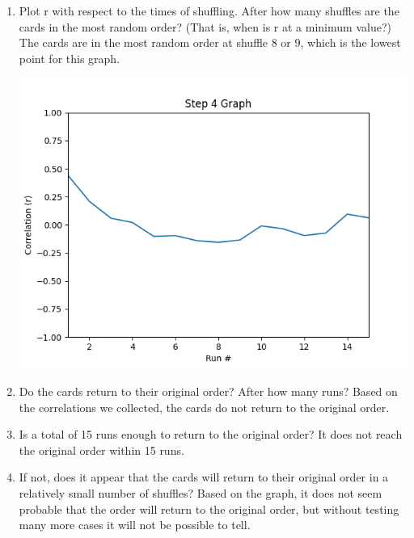 \documentclass[12pt]{article}
\begin{document}
    \begin{enumerate}
        \item Plot r with respect to the times of shuffling. After how many shuffles are the cards 
        in the most random order? (That is, when is r at a minimum value?)
        \subitem The cards are in the most random order at shuffle 8 or 9, which is the lowest point for this graph.\\
        \begin{minipage}[t]{\linewidth}
            \centering
            {
              \includegraphics[width=.7\linewidth]{Figure_4.png}
            }
            \medskip       
        \end{minipage}
        \item Do the cards return to their original order?  After how many runs?
        \subitem Based on the correlations we collected, the cards do not return to the original order.
        \item Is a total of 15 runs enough to return to the original order?
        \subitem It does not reach the original order within 15 runs.
        \item If not, does it appear that the cards will return to their original order in a relatively 
        small number of shuffles?
        \subitem Based on the graph, it does not seem probable that the order will return to the 
                 original order, but without testing many more cases it will not be possible to tell.
    \end{enumerate}
\end{document}
